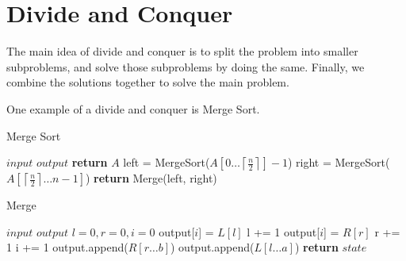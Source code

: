 
\section{Divide and Conquer}

The main idea of divide and conquer is to split the problem into smaller subproblems, and solve those subproblems by doing the same. Finally, we combine the solutions together to solve the main problem.

\begin{eg}
	One example of a divide and conquer is Merge Sort.
\end{eg}

\begin{algorithm}[H]
	\algrenewcommand{}
	\algrenewcommand{}
	\caption{Merge Sort}\label{alg:merge-sort}
	\begin{algorithmic}[1]
		\Require $input$
		\Ensure $output$
			\State \textbf{return} \( A \)
		\EndIf
		\State left = MergeSort(\( A[0\ldots \left\lceil \frac{n}{2} \right\rceil ] -1\))
		\State right = MergeSort(\( A[\left\lceil \frac{n}{2} \right\rceil \ldots n-1] \))
		\State \textbf{return} Merge(left, right)
	\end{algorithmic}
\end{algorithm}

\begin{algorithm}[H]
	\algrenewcommand{}
	\algrenewcommand{}
	\caption{Merge}\label{alg:merge-algo}
	\begin{algorithmic}[1]
		\Require $input$
		\Ensure $output$
		\State \( l=0, r=0, i=0 \)
				\State output[\( i \)] = \( L[l] \)
				\State l += 1 
			\Else
				\State output[\( i \)] = \( R[r] \)
				\State r += 1
			\EndIf
			\State i += 1
		\EndWhile
			\State output.append(\( R[r\ldots b] \))
		\Else
			\State output.append(\( L[l\ldots a] \))
		\EndIf
		\State \textbf{return} $state$
	\end{algorithmic}
\end{algorithm}

